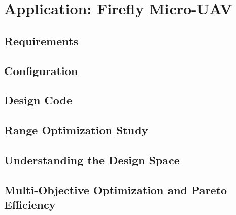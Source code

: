 \chapter{Application: Firefly Micro-UAV}
\label{chapter:firefly}

\section{Requirements}

\section{Configuration}

\section{Design Code}

\section{Range Optimization Study}

\section{Understanding the Design Space}

\section{Multi-Objective Optimization and Pareto Efficiency}